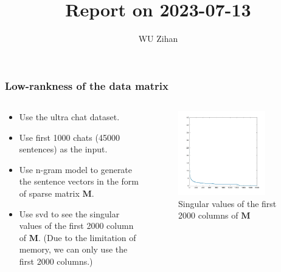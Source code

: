 \documentclass[aspectratio=169]{beamer}
\title{Report on 2023-07-13}
\author{WU Zihan}
\begin{document}
\maketitle

\begin{frame}
    \frametitle{Low-rankness of the data matrix}

    \begin{columns}
        \begin{column}{0.5\textwidth}


            \begin{itemize}
                \item Use the ultra chat dataset.
                \item Use first 1000 chats (45000 sentences) as the input.
                \item Use n-gram model to generate the sentence vectors in the form of sparse matrix $\mathbf{M}$.
                \item Use svd to see the singular values of the first 2000 column of $\mathbf{M}$. (Due to the limitation of memory, we can only use the first 2000 columns.)
            \end{itemize}

        \end{column}
        \begin{column}{0.5\textwidth}

            \begin{figure}[htbp]
                \centering
                \includegraphics[width=0.8\textwidth]{s.jpg}
                \caption{Singular values of the first 2000 columns of $\mathbf{M}$}
            \end{figure}
        \end{column}
    \end{columns}
\end{frame}
\end{document}
